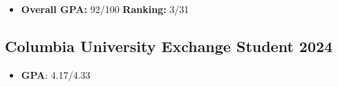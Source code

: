 \documentclass[a4paper]{article}
\begin{document}
\begin{itemize}
    \item \textbf{Overall GPA:} 92/100 \hfill \textbf{Ranking:} 3/31
\end{itemize}   

\subsection{Columbia University  \normalfont \hfill Exchange Student \hfill 2024}
\begin{itemize}
    \item \textbf{GPA}: 4.17/4.33
\end{itemize}
\end{document}
